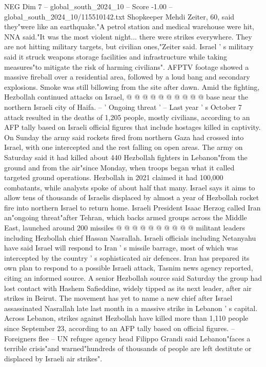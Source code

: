 \begin{textsample}{NEG Dim 7 – global\_south\_2024\_10 – Score -1.00 – global\_south\_2024\_10/115510142.txt}
Shopkeeper Mehdi Zeiter, 60, said they"were like an earthquake."A petrol station and medical warehouse were hit, NNA said."It was the most violent night... there were strikes everywhere.
They are not hitting military targets, but civilian ones,"Zeiter said.
Israel ' s military said it struck weapons storage facilities and infrastructure while taking measures"to mitigate the risk of harming civilians".
AFPTV footage showed a massive fireball over a residential area, followed by a loud bang and secondary explosions.
Smoke was still billowing from the site after dawn.
Amid the fighting, Hezbollah continued attacks on Israel, @ @ @ @ @ @ @ @ @ @ base near the northern Israeli city of Haifa. -- ' Ongoing threat ' -- Last year ' s October 7 attack resulted in the deaths of 1,205 people, mostly civilians, according to an AFP tally based on Israeli official figures that include hostages killed in captivity.
On Sunday the army said rockets fired from northern Gaza had crossed into Israel, with one intercepted and the rest falling on open areas.
The army on Saturday said it had killed about 440 Hezbollah fighters in Lebanon"from the ground and from the air"since Monday, when troops began what it called targeted ground operations.
Hezbollah in 2021 claimed it had 100,000 combatants, while analysts spoke of about half that many.
Israel says it aims to allow tens of thousands of Israelis displaced by almost a year of Hezbollah rocket fire into northern Israel to return home.
Israeli President Isaac Herzog called Iran an"ongoing threat"after Tehran, which backs armed groups across the Middle East, launched around 200 missiles @ @ @ @ @ @ @ @ @ @ militant leaders including Hezbollah chief Hassan Nasrallah.
Israeli officials including Netanyahu have said Israel will respond to Iran ' s missile barrage, most of which was intercepted by the country ' s sophisticated air defences.
Iran has prepared its own plan to respond to a possible Israeli attack, Tasnim news agency reported, citing an informed source.
A senior Hezbollah source said Saturday the group had lost contact with Hashem Safieddine, widely tipped as its next leader, after air strikes in Beirut.
The movement has yet to name a new chief after Israel assassinated Nasrallah late last month in a massive strike in Lebanon ' s capital.
Across Lebanon, strikes against Hezbollah have killed more than 1,110 people since September 23, according to an AFP tally based on official figures. -- Foreigners flee -- UN refugee agency head Filippo Grandi said Lebanon"faces a terrible crisis"and warned"hundreds of thousands of people are left destitute or displaced by Israeli air strikes".

\end{textsample}
